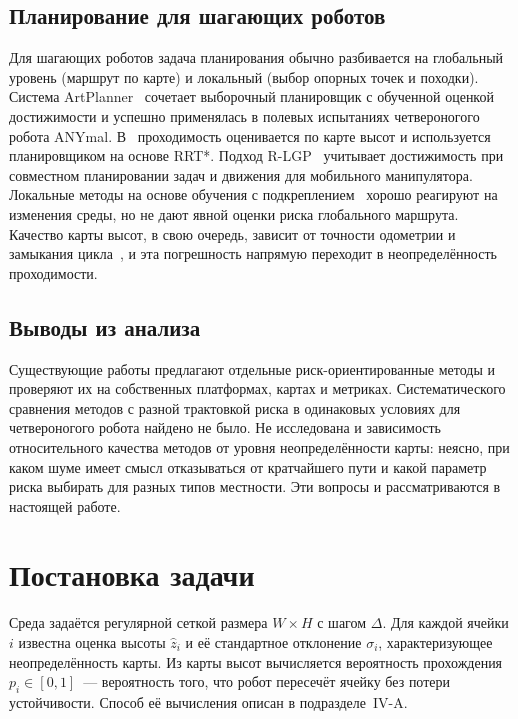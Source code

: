 \documentclass{misisarticle}
\begin{document}
\subsection{Планирование для шагающих роботов}

Для шагающих роботов задача планирования обычно разбивается на глобальный уровень (маршрут по карте) и локальный (выбор опорных точек и походки). Система ArtPlanner~\cite{wellhausen2023} сочетает выборочный планировщик с обученной оценкой достижимости и успешно применялась в полевых испытаниях четвероногого робота ANYmal. В~\cite{wermelinger2016} проходимость оценивается по карте высот и используется планировщиком на основе RRT*. Подход R-LGP~\cite{ly2024} учитывает достижимость при совместном планировании задач и движения для мобильного манипулятора. Локальные методы на основе обучения с подкреплением~\cite{kiselev2025} хорошо реагируют на изменения среды, но не дают явной оценки риска глобального маршрута. Качество карты высот, в свою очередь, зависит от точности одометрии и замыкания цикла~\cite{epifanov2025}, и эта погрешность напрямую переходит в неопределённость проходимости.

\subsection{Выводы из анализа}

Существующие работы предлагают отдельные риск-ориентированные методы и проверяют их на собственных платформах, картах и метриках. Систематического сравнения методов с разной трактовкой риска в одинаковых условиях для четвероногого робота найдено не было. Не исследована и зависимость относительного качества методов от уровня неопределённости карты: неясно, при каком шуме имеет смысл отказываться от кратчайшего пути и какой параметр риска выбирать для разных типов местности. Эти вопросы и рассматриваются в настоящей работе.

\section{Постановка задачи}

Среда задаётся регулярной сеткой размера $W \times H$ с шагом $\Delta$. Для каждой ячейки $i$ известна оценка высоты $\hat z_i$ и её стандартное отклонение $\sigma_i$, характеризующее неопределённость карты. Из карты высот вычисляется вероятность прохождения $p_i \in [0, 1]$~--- вероятность того, что робот пересечёт ячейку без потери устойчивости. Способ её вычисления описан в подразделе~IV-A.
\end{document}
